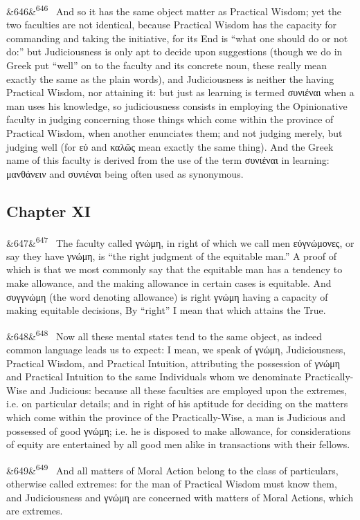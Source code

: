 \documentclass[12pt]{article}
\newcommand{\para}[1][]{\par\noindent\ifx&#1&\else\textsuperscript{\footnotesize #1}~\fi}
\begin{document}
\para[646] And so it has the same object matter as Practical Wisdom; yet the two faculties are not identical, because Practical Wisdom has the capacity for commanding and taking the initiative, for its End is “what one should do or not do:” but Judiciousness is only apt to decide upon suggestions (though we do in Greek put “well” on to the faculty and its concrete noun, these really mean exactly the same as the plain words), and Judiciousness is neither the having Practical Wisdom, nor attaining it: but just as learning is termed συνιέναι when a man uses his knowledge, so judiciousness consists in employing the Opinionative faculty in judging concerning those things which come within the province of Practical Wisdom, when another enunciates them; and not judging merely, but judging well (for εὐ and καλῶς mean exactly the same thing). And the Greek name of this faculty is derived from the use of the term συνιέναι in learning: μανθάνειν and συνιέναι being often used as synonymous.

\subsection*{Chapter XI}

\para[647] The faculty called γνώμη, in right of which we call men εὐγνώμονες, or say they have γνώμη, is “the right judgment of the equitable man.” A proof of which is that we most commonly say that the equitable man has a tendency to make allowance, and the making allowance in certain cases is equitable. And συγγνώμη (the word denoting allowance) is right γνώμη having a capacity of making equitable decisions, By “right” I mean that which attains the True.

\para[648] Now all these mental states tend to the same object, as indeed common language leads us to expect: I mean, we speak of γνώμη, Judiciousness, Practical Wisdom, and Practical Intuition, attributing the possession of γνώμη and Practical Intuition to the same Individuals whom we denominate Practically-Wise and Judicious: because all these faculties are employed upon the extremes, i.e. on particular details; and in right of his aptitude for deciding on the matters which come within the province of the Practically-Wise, a man is Judicious and possessed of good γνώμη; i.e. he is disposed to make allowance, for considerations of equity are entertained by all good men alike in transactions with their fellows.

\para[649] And all matters of Moral Action belong to the class of particulars, otherwise called extremes: for the man of Practical Wisdom must know them, and Judiciousness and γνώμη are concerned with matters of Moral Actions, which are extremes.
\end{document}
